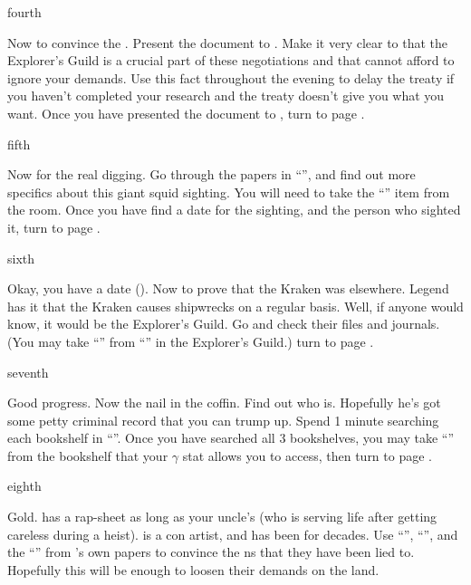 \documentclass[greennotebook]{NeptuneBall}
\begin{document}
\begin{page}{fourth}

Now to convince the \cKing{\King}. Present the document to \cKing{\King} \cKing{}. Make it very clear to \cKing{\them} that the Explorer's Guild is a crucial part of these negotiations and that \cKing{\they} cannot afford to ignore your demands. Use this fact throughout the evening to delay the treaty if you haven't completed your research and the treaty doesn't give you what you want. Once you have presented the document to \cKing{}, turn to page .

\end{page}

\begin{page}{fifth}

Now for the real digging. Go through the papers in ``\sPrince{}'', and find out more specifics about this giant squid sighting. You will need to take the ``\iReference{}'' item from the room. Once you have find a date for the sighting, and the person who sighted it, turn to page .

\end{page}

\begin{page}{sixth}

Okay, you have a date (\cKraken{\MYname}). Now to prove that the Kraken was elsewhere. Legend has it that the Kraken causes shipwrecks on a regular basis. Well, if anyone would know, it would be the Explorer's Guild. Go and check their files and journals. (You may take ``\iNorthSeasJournal{}'' from ``\sJournals{}'' in the Explorer's Guild.)  turn to page .

\end{page}

\begin{page}{seventh}

Good progress. Now the nail in the coffin. Find out who \cLiar{\MYname} is. Hopefully he's got some petty criminal record that you can trump up. Spend 1 minute searching each bookshelf in ``\sMuseum{}''. Once you have searched all 3 bookshelves, you may take ``\iRapSheet{}'' from the bookshelf that your $\gamma$ stat allows you to access, then turn to page .

\end{page}

\begin{page}{eighth}


Gold. \cLiar{\MYname} has a rap-sheet as long as your uncle's (who is serving life after getting careless during a heist). \cLiar{} is a con artist, and has been for decades. Use ``\iNorthSeasJournal{}'', ``\iRapSheet{}'', and the ``\iReference{}'' from \cPrince{}'s own papers to convince the \pPacifica{}ns that they have been lied to. Hopefully this will be enough to loosen their demands on the land.

\end{page}


\endnotebook
\end{document}
